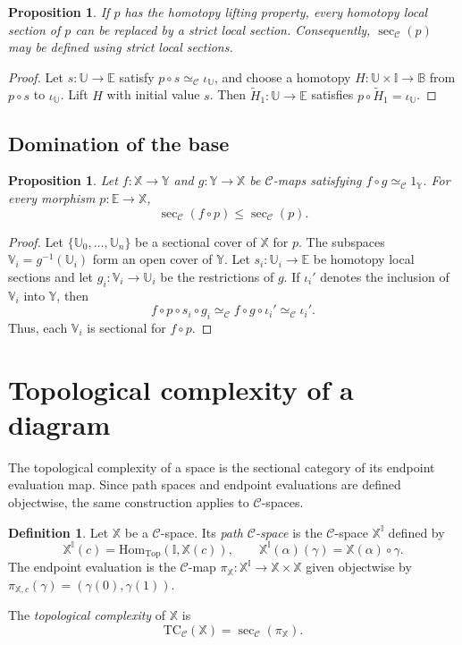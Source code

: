 \documentclass[12pt]{amsart}
\newtheorem{prop}[teo]{Proposition}
\theoremstyle{definition}
\newtheorem{defi}[teo]{Definition}
\theoremstyle{remark}
\numberwithin{figure}{section}%
\newcommand{\CC}{\mathcal{C}}
\newcommand{\TC}{\mathrm{TC}}
\newcommand{\Top}{\mathrm{Top}}
\newcommand{\X}{\mathbb{X}}
\newcommand{\Y}{\mathbb{Y}}
\newcommand{\V}{\mathbb{V}}
\newcommand{\Hom}{\mathrm{Hom}}
\newcommand{\Ee}{\mathbb{E}}
\newcommand{\Bb}{\mathbb{B}}
\newcommand{\Uu}{\mathbb{U}}
\begin{document}
\begin{prop}\label{prop:homotopy-sections-strict}
If $p$ has the homotopy lifting property, every homotopy local section
of $p$ can be replaced by a strict local section. Consequently,
$\sec_{\CC}(p)$ may be defined using strict local sections.
\end{prop}

\begin{proof}
Let $s\colon\Uu\to\Ee$ satisfy
$p\circ s\simeq_{\CC}\iota_{\Uu}$, and choose a homotopy
$H\colon\Uu\times\mathbb I\to\Bb$ from $p\circ s$ to
$\iota_{\Uu}$. Lift $H$ with initial value $s$. Then
$\widetilde H_1\colon\Uu\to\Ee$ satisfies
$p\circ\widetilde H_1=\iota_{\Uu}$.
\end{proof}

\subsection{Domination of the base}

\begin{prop}
\label{prop:homotopic_invariance_base}
\label{cor:sectional-homotopy-base}
Let $f\colon\X\to\Y$ and $g\colon\Y\to\X$ be $\CC$-maps satisfying
$f\circ g\simeq_{\CC}1_{\Y}$. For every morphism
$p\colon\Ee\to\X$,
\[
\sec_{\CC}(f\circ p)\leq\sec_{\CC}(p).
\]
\end{prop}

\begin{proof}
Let $\{\Uu_0,\ldots,\Uu_n\}$ be a sectional cover of $\X$ for $p$.
The subspaces $\V_i=g^{-1}(\Uu_i)$ form an open cover of $\Y$. Let
$s_i\colon\Uu_i\to\Ee$ be homotopy local sections and let
$g_i\colon\V_i\to\Uu_i$ be the restrictions of $g$. If
$\iota_i'$ denotes the inclusion of $\V_i$ into $\Y$, then
\[
f\circ p\circ s_i\circ g_i
\simeq_{\CC}
f\circ g\circ\iota_i'
\simeq_{\CC}
\iota_i'.
\]
Thus, each $\V_i$ is sectional for $f\circ p$.
\end{proof}


\section{Topological complexity of a diagram}
\label{sec:topological-complexity}

The topological complexity of a space is the sectional category of its
endpoint evaluation map. Since path spaces and endpoint evaluations are
defined objectwise, the same construction applies to $\CC$-spaces.

\begin{defi}
\label{def:path-diagram}
\label{def:TC-diagram}
Let $\X$ be a $\CC$-space. Its \emph{path $\CC$-space} is the
$\CC$-space $\X^{\mathbb I}$ defined by
\[
\X^{\mathbb I}(c)=\Hom_{\Top}(\mathbb I,\X(c)),
\qquad
\X^{\mathbb I}(\alpha)(\gamma)=\X(\alpha)\circ\gamma.
\]
The endpoint evaluation is the $\CC$-map
$\pi_{\X}\colon\X^{\mathbb I}\to\X\times\X$ given objectwise by
$\pi_{\X,c}(\gamma)=(\gamma(0),\gamma(1))$.

The \emph{topological complexity} of $\X$ is
\[
\TC_{\CC}(\X)=\sec_{\CC}(\pi_{\X}).
\]
\end{defi}
\end{document}
